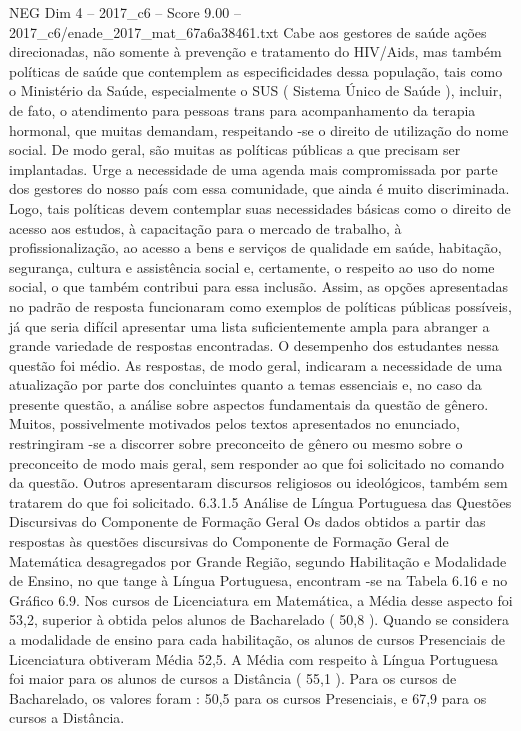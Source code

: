 \begin{textsample}{NEG Dim 4 – 2017\_c6 – Score 9.00 – 2017\_c6/enade\_2017\_mat\_67a6a38461.txt}
Cabe aos gestores de saúde ações direcionadas, não somente à prevenção e tratamento do HIV/Aids, mas também políticas de saúde que contemplem as especificidades dessa população, tais como o Ministério da Saúde, especialmente o SUS ( Sistema Único de Saúde ), incluir, de fato, o atendimento para pessoas trans para acompanhamento da terapia hormonal, que muitas demandam, respeitando -se o direito de utilização do nome social.
De modo geral, são muitas as políticas públicas a que precisam ser implantadas.
Urge a necessidade de uma agenda mais compromissada por parte dos gestores do nosso país com essa comunidade, que ainda é muito discriminada.
Logo, tais políticas devem contemplar suas necessidades básicas como o direito de acesso aos estudos, à capacitação para o mercado de trabalho, à profissionalização, ao acesso a bens e serviços de qualidade em saúde, habitação, segurança, cultura e assistência social e, certamente, o respeito ao uso do nome social, o que também contribui para essa inclusão.
Assim, as opções apresentadas no padrão de resposta funcionaram como exemplos de políticas públicas possíveis, já que seria difícil apresentar uma lista suficientemente ampla para abranger a grande variedade de respostas encontradas.
O desempenho dos estudantes nessa questão foi médio.
As respostas, de modo geral, indicaram a necessidade de uma atualização por parte dos concluintes quanto a temas essenciais e, no caso da presente questão, a análise sobre aspectos fundamentais da questão de gênero.
Muitos, possivelmente motivados pelos textos apresentados no enunciado, restringiram -se a discorrer sobre preconceito de gênero ou mesmo sobre o preconceito de modo mais geral, sem responder ao que foi solicitado no comando da questão.
Outros apresentaram discursos religiosos ou ideológicos, também sem tratarem do que foi solicitado. 6.3.1.5 Análise de Língua Portuguesa das Questões Discursivas do Componente de Formação Geral Os dados obtidos a partir das respostas às questões discursivas do Componente de Formação Geral de Matemática desagregados por Grande Região, segundo Habilitação e Modalidade de Ensino, no que tange à Língua Portuguesa, encontram -se na Tabela 6.16 e no Gráfico 6.9.
Nos cursos de Licenciatura em Matemática, a Média desse aspecto foi 53,2, superior à obtida pelos alunos de Bacharelado ( 50,8 ).
Quando se considera a modalidade de ensino para cada habilitação, os alunos de cursos Presenciais de Licenciatura obtiveram Média 52,5.
A Média com respeito à Língua Portuguesa foi maior para os alunos de cursos a Distância ( 55,1 ).
Para os cursos de Bacharelado, os valores foram : 50,5 para os cursos Presenciais, e 67,9 para os cursos a Distância.

\end{textsample}
